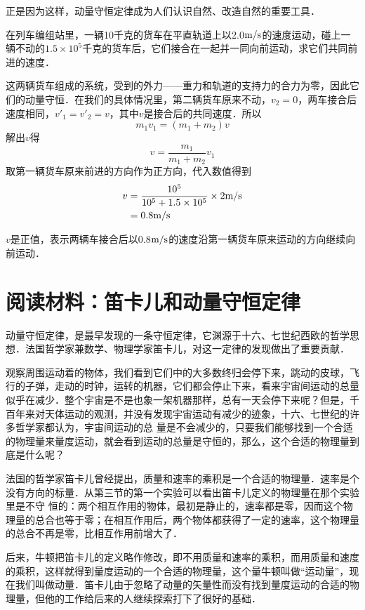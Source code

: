 正是因为这样，动量守恒定律成为人们认识自然、改造自然的重要工具．


\begin{example}
    在列车编组站里，一辆10千克的货车在平直轨道上以2.0$\text{m}/\text{s}$的速度运动，碰上一辆不动的$1.5\times 10^5$千克的货车后，它们接合在一起并一同向前运动，求它们共同前进的速度．
\end{example}


\begin{solution}
    这两辆货车组成的系统，受到的外力——重力和轨道的支持力的合力为零，因此它们的动量守恒．在我们的具体情况里，第二辆货车原来不动，$v_2=0$，两车接合后速度相同，$v'_1=v'_2=v$，其中$v$是接合后的共同速度．所以
\[m_1v_1=(m_1+m_2)v \]
解出$v$得
\[v=\frac{m_1}{m_1+m_2}v_1\]
取第一辆货车原来前进的方向作为正方向，代入数值得到
\[\begin{split}
    v&=\frac{10^5}{10^5+1.5\times 10^5}\times 2\text{m}/\text{s}\\
    &=0.8\text{m}/\text{s}
\end{split}\]
\end{solution}
$v$是正值，表示两辆车接合后以0.8$\text{m}/\text{s}$的速度沿第一辆货车原来运动的方向继续向前运动．


\section*{阅读材料：笛卡儿和动量守恒定律}
动量守恒定律，是最早发现的一条守恒定律，它渊源于十六、七世纪西欧的哲学思想．法国哲学家兼数学、物理学家笛卡儿，对这一定律的发现做出了重要贡献．

观察周围运动着的物体，我们看到它们中的大多数终归会停下来，跳动的皮球，飞行的子弹，走动的时钟，运转的机器，它们都会停止下来，看来宇宙间运动的总量似乎在减少．整个宇宙是不是也象一架机器那样，总有一天会停下来呢？但是，千百年来对天体运动的观测，并没有发现宇宙运动有减少的迹象，十六、七世纪的许多哲学家都认为，宇宙间运动的总
量是不会减少的，只要我们能够找到一个合适的物理量来量度运动，就会看到运动的总量是守恒的，那么，这个合适的物理量到底是什么呢？

法国的哲学家笛卡儿曾经提出，质量和速率的乘积是一个合适的物理量．速率是个没有方向的标量．从第三节的第一个实验可以看出笛卡儿定义的物理量在那个实验里是不守
恒的：两个相互作用的物体，最初是静止的，速率都是零，因而这个物理量的总合也等于零；在相互作用后，两个物体都获得了一定的速率，这个物理量的总合不再是零，比相互作用前增大了．

后来，牛顿把笛卡儿的定义略作修改，即不用质量和速率的乘积，而用质量和速度的乘积，这样就得到量度运动的一个合适的物理量，这个量牛顿叫做“运动量”，现在我们叫做动量．笛卡儿由于忽略了动量的矢量性而没有找到量度运动的合适的物理量，但他的工作给后来的人继续探索打下了很好的基础．


